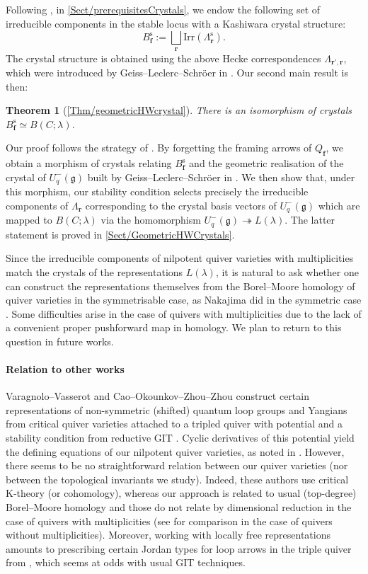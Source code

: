 \documentclass[a4paper,12pt]{article}
\theoremstyle{definition}
\theoremstyle{plain}
\newtheorem{theoremAlph}{Theorem}
\theoremstyle{remark}
\newcommand{\st}{\mathrm{s}}
\newcommand\bff{\mathbf{f}}
\newcommand\bfr{\mathbf{r}}
\begin{document}
Following \cite{Sai02,GLS18a}, in \cref{Sect/prerequisitesCrystals}, we endow the following set of irreducible components in the stable locus with a Kashiwara crystal structure:
\[
B_\bff^\st:=\bigsqcup_{\bfr}\mathrm{Irr}(\Lambda_\bfr^\st).
\]
The crystal structure is obtained using the above Hecke correspondences $\Lambda_{\bfr',\bfr}$, which were introduced by Geiss--Leclerc--Schr\"{o}er in \cite{GLS18a}. Our second main result is then: 

\begin{theoremAlph}[\cref{Thm/geometricHWcrystal}]\label{MainThm/crystalConstruction}
There is an isomorphism of crystals $B_\bff^\st\simeq B(C;\lambda)$.
\end{theoremAlph}

Our proof follows the strategy of \cite{Sai02}. By forgetting the framing arrows of $Q_\bff$, we obtain a morphism of crystals relating $B_\bff^\st$ and the geometric realisation of the crystal of $U_q^-(\mathfrak{g})$ built by Geiss--Leclerc--Schr\"{o}er in \cite{GLS18a}. We then show that, under this morphism, our stability condition selects precisely the irreducible components of $\Lambda_\bfr$ corresponding to the crystal basis vectors of $U_q^-(\mathfrak{g})$ which are mapped to $B(C;\lambda)$ via the homomorphism $U_q^-(\mathfrak{g})\twoheadrightarrow L(\lambda)$. The latter statement is proved in \cref{Sect/GeometricHWCrystals}.

Since the irreducible components of nilpotent quiver varieties with multiplicities match the crystals of the representations $L(\lambda)$, it is natural to ask whether one can construct the representations themselves from the Borel--Moore homology of quiver varieties in the symmetrisable case, as Nakajima did in the symmetric case \cite{Nak98}. Some difficulties arise in the case of quivers with multiplicities due to the lack of a convenient proper pushforward map in homology. We plan to return to this question in future works.

\paragraph*{Relation to other works}

Varagnolo--Vasserot and Cao--Okounkov--Zhou--Zhou construct certain representations of non-symmetric (shifted) quantum loop groups and Yangians from critical quiver varieties attached to a tripled quiver with potential and a stability condition from reductive GIT \cite{VV23b,COZZ26a}. Cyclic derivatives of this potential yield the defining equations of our nilpotent quiver varieties, as noted in \cite{GLS17a}. However, there seems to be no straightforward relation between our quiver varieties (nor between the topological invariants we study). Indeed, these authors use critical K-theory (or cohomology), whereas our approach is related to usual (top-degree) Borel--Moore homology and those do not relate by dimensional reduction in the case of quivers with multiplicities (see \cite{Dav17,Pad22a,VV22} for comparison in the case of quivers without multiplicities). Moreover, working with locally free representations amounts to prescribing certain Jordan types for loop arrows in the triple quiver from \cite{VV23b,COZZ26a}, which seems at odds with usual GIT techniques.
\end{document}
